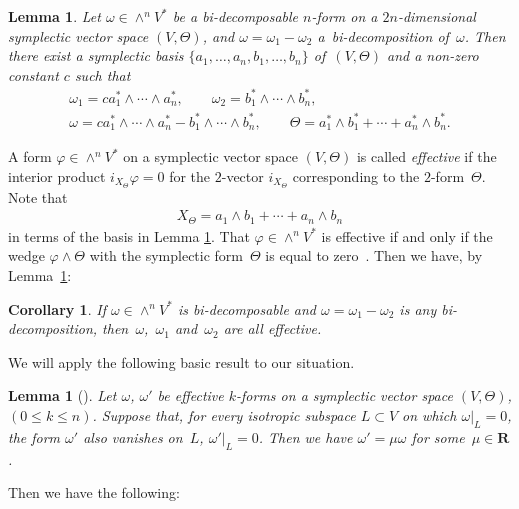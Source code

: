 \documentclass[11pt]{article}
\newtheorem{Cor}[Th]{Corollary}
\newtheorem{Lem}[Th]{Lemma}
{ \theoremstyle{definition}
\newtheorem{Def}[Th]{Definition}
\newtheorem{Rem}[Th]{Remark}
\newtheorem{Ex}[Th]{Example}}
\begin{document}
\begin{Lem}
\label{symplectic basis}
Let $\omega \in \wedge^n V^*$ be a bi-decomposable $n$-form on
a $2n$-dimensional symplectic vector space $(V, \Theta)$, and
$\omega = \omega_1 - \omega_2$ a~bi-decomposition of~$\omega$.
Then there exist a symplectic basis
$\{ a_1,\dots, a_n, b_1,\dots, b_n\}$ of~$(V, \Theta)$
and a non-zero constant $c$ such that
\begin{gather*}
\omega_1  =
c  a_1^*\wedge \cdots \wedge a_n^*, \qquad
\omega_2  =   b_1^*\wedge \cdots \wedge b_n^*,
\\
\omega  =  c  a_1^*\wedge \cdots \wedge a_n^* -
b_1^*\wedge \cdots \wedge b_n^*,
\qquad
\Theta  =  a_1^* \wedge b_1^* + \cdots + a_n^* \wedge b_n^*.
\end{gather*}
\end{Lem}

A form $\varphi \in \wedge^n V^*$ on
a symplectic vector space $(V,\Theta)$
is called {\it effective} if
the interior product $i_{X_{\Theta}}\varphi = 0$ for
the $2$-vector $i_{X_{\Theta}}$ corresponding to the
$2$-form~$\Theta$.
Note that
\begin{gather*}
X_{\Theta} = a_1 \wedge b_1 + \cdots + a_n \wedge b_n
\end{gather*}
in terms of the basis in Lemma \ref{symplectic basis}.
That $\varphi \in \wedge^n V^*$ is ef\/fective if and only if
the wedge $\varphi\wedge\Theta$ with the symplectic form~$\Theta$ is equal to zero~\cite{B2, L}.
Then we have, by Lemma~\ref{symplectic basis}:

\begin{Cor}
\label{effective}
If $\omega \in \wedge^n V^*$ is bi-decomposable and
$\omega = \omega_1 - \omega_2$ is any bi-decomposition, then~$\omega$,~$\omega_1$ and~$\omega_2$ are all effective.
\end{Cor}

We will apply the following basic result to our situation.

\begin{Lem}[]\label{Lych}
Let $\omega$, $\omega'$ be effective $k$-forms on a symplectic vector space
$(V, \Theta)$, $(0\leq k\leq n)$.
Suppose that, for every isotropic subspace $L\subset V$ on which
$\omega\vert_L = 0$, the form $\omega'$ also vanishes on~$L$,
$\omega'\vert_L = 0$.
Then we have $\omega' =\mu{\omega}$ for some~$\mu \in {\mathbf{R}}$.
\end{Lem}

Then we have the following:
\end{document}
